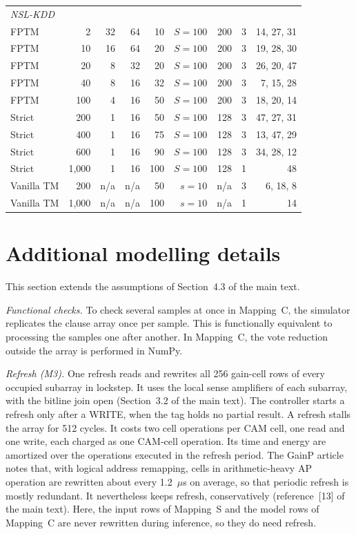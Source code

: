 \documentclass[preprint,12pt]{elsarticle}
\newcommand{\gainp}{GainP}
\newcommand{\hyp}[1]{#1}
\begin{document}
\begin{table}[H]
\begin{tabular}{lrrrrrrrr}
\midrule
\multicolumn{9}{l}{\textit{NSL-KDD}} \\
FPTM & 2 & 32 & 64 & 10 & $S=100$ & 200 & 3 & 14, 27, 31 \\
FPTM & 10 & 16 & 64 & 20 & $S=100$ & 200 & 3 & 19, 28, 30 \\
FPTM & 20 & 8 & 32 & 20 & $S=100$ & 200 & 3 & 26, 20, 47 \\
FPTM & 40 & 8 & 16 & 32 & $S=100$ & 200 & 3 & 7, 15, 28 \\
FPTM & 100 & 4 & 16 & 50 & $S=100$ & 200 & 3 & 18, 20, 14 \\
Strict & 200 & 1 & 16 & 50 & $S=100$ & 128 & 3 & 47, 27, 31 \\
Strict & 400 & 1 & 16 & 75 & $S=100$ & 128 & 3 & 13, 47, 29 \\
Strict & 600 & 1 & 16 & 90 & $S=100$ & 128 & 3 & 34, 28, 12 \\
Strict & 1,000 & 1 & 16 & 100 & $S=100$ & 128 & 1 & 48 \\
Vanilla TM & 200 & n/a & n/a & 50 & $s=10$ & n/a & 3 & 6, 18, 8 \\
Vanilla TM & 1,000 & n/a & n/a & 100 & $s=10$ & n/a & 1 & 14 \\
\bottomrule
\end{tabular}
\end{table}

\section{Additional modelling details}\label{modelling}
This section extends the assumptions of Section~4.3 of the main text.

\textit{Functional checks.} To check several samples at once in Mapping~C, the simulator replicates the clause array once per sample. This is functionally equivalent to processing the samples one after another.
In Mapping~C, the vote reduction outside the array is performed in NumPy.

\textit{Refresh (M3).} \hyp{One refresh reads and rewrites all 256 gain-cell rows of every occupied subarray in lockstep. It uses the local sense amplifiers of each subarray, with the bitline join open (Section~3.2 of the main text). The controller starts a refresh only after a WRITE, when the tag holds no partial result. A refresh stalls the array for 512 cycles. It costs two cell operations per CAM cell, one read and one write, each charged as one CAM-cell operation. Its time and energy are amortized over the operations executed in the refresh period.}
The \gainp{} article notes that, with logical address remapping, cells in arithmetic-heavy AP operation are rewritten about every 1.2~$\mu$s on average, so that periodic refresh is mostly redundant. It nevertheless keeps refresh, conservatively (reference~[13] of the main text). \hyp{Here, the input rows of Mapping~S and the model rows of Mapping~C are never rewritten during inference, so they do need refresh.
}
\end{document}
